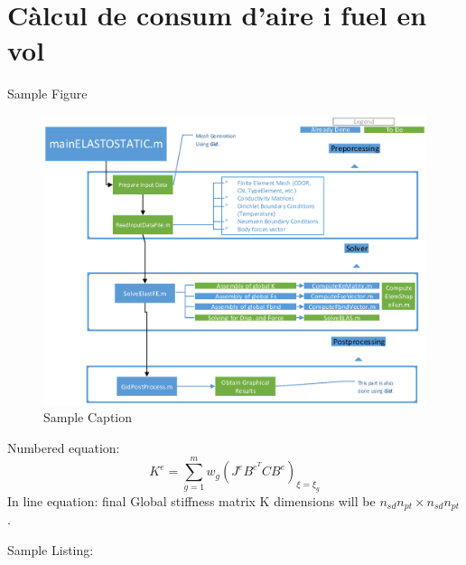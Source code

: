 \section{Càlcul de consum d’aire i fuel en vol}
Sample Figure
\begin{figure}[H]
	\centering
	\includegraphics[scale=0.9]{./pics/sample}
	\caption{Sample Caption}
\end{figure}
Numbered equation:
\begin{equation}
	K^e = \sum_{g=1}^{m}w_g (J^eB^{e^T}C B^e)_{\xi=\xi_g}
\end{equation}
In line equation:
final Global stiffness matrix K dimensions will be $n_{sd}n_{pt}\times n_{sd}n_{pt}$.

Sample Listing:


